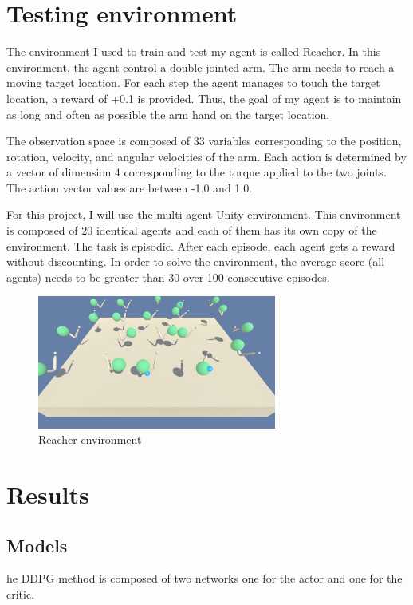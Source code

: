 \documentclass[12pt]{article}
\begin{document}
\section{Testing environment}
The environment I used to train and test my agent is called Reacher. In this environment, the agent control a double-jointed arm. The arm needs to reach a moving target location. For each step the agent manages to touch the target location, a reward of +0.1 is provided. Thus, the goal of my agent is to maintain as long and often as possible the arm hand on the target location.

The observation space is composed of 33 variables corresponding to the position, rotation, velocity, and angular velocities of the arm. Each action is determined by a vector of dimension 4 corresponding to the torque applied to the two joints. The action vector values are between -1.0 and 1.0.

For this project, I will use the multi-agent Unity environment. This environment is composed of 20 identical agents and each of them has its own copy of the environment. The task is episodic. After each episode, each agent gets a reward without discounting.  In order to solve the environment, the average score (all agents) needs to be greater than 30 over 100 consecutive episodes.

\begin{center}
\begin{figure}[H]
  \center
  \includegraphics[width=0.7\textwidth]{../PNG/env.png}
  \caption{Reacher environment}
  \label{fig:reacher_environment}
\end{figure}
\end{center}


\section{Results} 
\subsection{Models}
he DDPG method is composed of two networks one for the actor and one for the critic.
\end{document}
